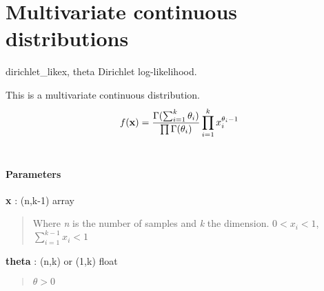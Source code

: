 \section{Multivariate continuous distributions}

\hypertarget{pymc.distributions.dirichlet_like}{}
\begin{funcdesc}{dirichlet\_like}{x, theta}
Dirichlet log-likelihood.

This is a multivariate continuous distribution.
\begin{gather}
\begin{split}f(\mathbf{x}) = \frac{\Gamma(\sum_{i=1}^k \theta_i)}{\prod \Gamma(\theta_i)} \prod_{i=1}^k x_i^{\theta_i - 1}\end{split}\notag\\\begin{split}\end{split}\notag
\end{gather}\paragraph{Parameters}\begin{paramlist}

\item[] \textbf{x} : (n,k-1) array
\begin{quote}

Where \emph{n} is the number of samples and \emph{k} the dimension.
$0 < x_i < 1$,  $\sum_{i=1}^{k-1} x_i < 1$
\end{quote}

\item[] \textbf{theta} : (n,k) or (1,k) float
\begin{quote}

$\theta > 0$
\end{quote}
\end{paramlist}
\end{funcdesc}


